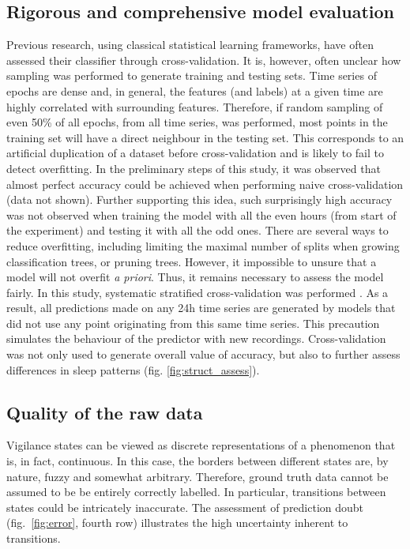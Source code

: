 \subsection{Rigorous and comprehensive model evaluation}

Previous research, using classical statistical learning frameworks,
have often assessed their classifier through cross-validation.
It is, however, often unclear how sampling was performed to generate training and
testing sets\cite{ebrahimi_automatic_2008, chapotot_automated_2010, sen_comparative_2014}.
Time series of epochs are dense and, in general,
the features (and labels) at a given time are highly correlated with surrounding features.
Therefore, if random sampling of even 50\% of all epochs, from all time series, was performed,
most points in the training set will have a direct neighbour in the testing set.
This corresponds to an artificial duplication of a dataset before cross-validation and is likely to fail to detect overfitting.
In the preliminary steps of this study, it was observed that almost perfect accuracy could be achieved when performing naive cross-validation (data not shown).
Further supporting this idea, such surprisingly high accuracy was not observed when training the model
with all the even hours (from start of the experiment) and testing it with all the odd ones.
There are several ways to reduce overfitting, including limiting the maximal number of splits when growing classification trees, or pruning trees.
However, it impossible to unsure that a model will not overfit \emph{a priori}.
Thus, it remains necessary to assess the model fairly.
In this study, systematic stratified cross-validation was
performed \cite{ding_querying_2008}.
As a result, all predictions made on any 24h time series are generated by models
that did not use any point originating from this same time series. This precaution simulates the behaviour of the predictor with new recordings.
Cross-validation was not only used to generate overall value of accuracy, but also to further assess differences in sleep patterns (fig. \ref{fig:struct_assess}).

\subsection{Quality of the raw data}

Vigilance states can be viewed as discrete representations of a phenomenon that is, in fact, continuous.
In this case, the borders between different states are, by nature, fuzzy and somewhat arbitrary.
Therefore, ground truth data cannot be assumed to be be entirely correctly labelled.
In particular, transitions between states could be intricately inaccurate.
The assessment of prediction doubt (fig.~\ref{fig:error}, fourth row) illustrates the high uncertainty inherent to transitions.

